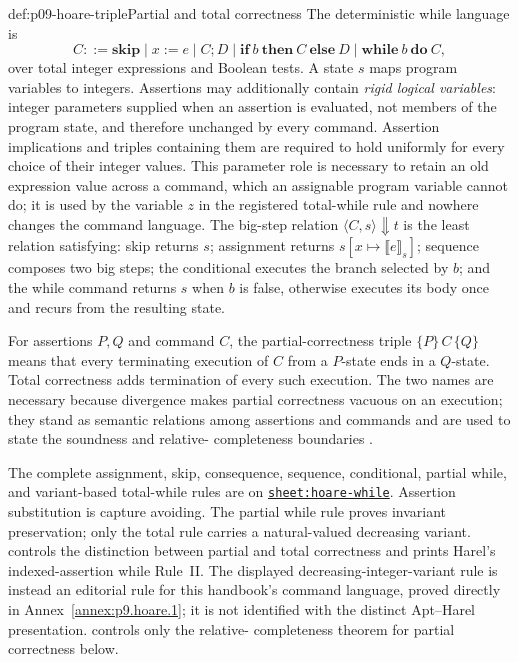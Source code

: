 \begin{hbdefinition}{def:p09-hoare-triple}{Partial and total correctness}
The deterministic while language is
\[
 C::=\mathbf{skip}\mid x:=e\mid C;D\mid
 \mathbf{if}\ b\ \mathbf{then}\ C\ \mathbf{else}\ D\mid
 \mathbf{while}\ b\ \mathbf{do}\ C,
\]
over total integer expressions and Boolean tests.  A state \(s\) maps program
variables to integers.  Assertions may additionally contain \emph{rigid
logical variables}: integer parameters supplied when an assertion is
evaluated, not members of the program state, and therefore unchanged by every
command.  Assertion implications and triples containing them are required to
hold uniformly for every choice of their integer values.  This parameter role
is necessary to retain an old expression value across a command, which an
assignable program variable cannot do; it is used by the variable \(z\) in the
registered total-while rule and nowhere changes the command language.  The
big-step relation
\(\langle C,s\rangle\Downarrow t\) is the least relation satisfying: skip
returns \(s\); assignment returns \(s[x\mapsto\llbracket e\rrbracket_s]\);
sequence composes two big steps; the conditional executes the branch selected
by \(b\); and the while command returns \(s\) when \(b\) is false, otherwise
executes its body once and recurs from the resulting state.

For assertions \(P,Q\) and command \(C\), the partial-correctness triple
\(\{P\}\,C\,\{Q\}\) means that every terminating execution of \(C\) from a
\(P\)-state ends in a \(Q\)-state. Total correctness adds termination of every
such execution. The two names are necessary because divergence makes partial
correctness vacuous on an execution; they stand as semantic relations among
assertions and commands and are used to state the soundness and relative-
completeness boundaries \cite{Floyd1967,Hoare1969}.
\end{hbdefinition}

The complete assignment, skip, consequence, sequence, conditional, partial
while, and variant-based total-while rules are on
\hyperref[sheet:hoare-while]{\texttt{sheet:hoare-while}}.  Assertion
substitution is capture avoiding.  The partial while rule proves invariant
preservation; only the total rule carries a natural-valued decreasing variant.
\textcite{Apt1981} controls the distinction between partial and total
correctness and prints Harel's indexed-assertion while Rule~II.  The displayed
decreasing-integer-variant rule is instead an editorial rule for this
handbook's command language, proved directly in
Annex~\ref{annex:p9.hoare.1}; it is not identified with the distinct
Apt--Harel presentation.  \textcite{Cook1978} controls only the relative-
completeness theorem for partial correctness below.

